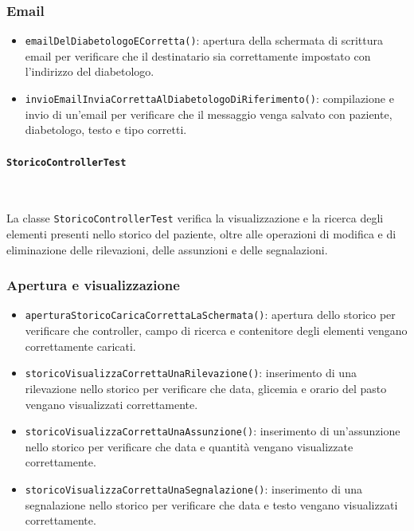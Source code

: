 \subsubsection*{Email}

\begin{itemize}
	
	\item \texttt{emailDelDiabetologoECorretta()}: apertura della schermata di scrittura email per verificare che il destinatario sia correttamente impostato con l'indirizzo del diabetologo.
	
	\item \texttt{invioEmailInviaCorrettaAlDiabetologoDiRiferimento()}: compilazione e invio di un'email per verificare che il messaggio venga salvato con paziente, diabetologo, testo e tipo corretti.
	
\end{itemize}

\paragraph{\texttt{StoricoControllerTest}}\mbox{}\

La classe \texttt{StoricoControllerTest} verifica la visualizzazione e la ricerca degli elementi presenti nello storico del paziente, oltre alle operazioni di modifica e di eliminazione delle rilevazioni, delle assunzioni e delle segnalazioni.

\subsubsection*{Apertura e visualizzazione}

\begin{itemize}
	
	\item \texttt{aperturaStoricoCaricaCorrettaLaSchermata()}: apertura dello storico per verificare che controller, campo di ricerca e contenitore degli elementi vengano correttamente caricati.
	
	\item \texttt{storicoVisualizzaCorrettaUnaRilevazione()}: inserimento di una rilevazione nello storico per verificare che data, glicemia e orario del pasto vengano visualizzati correttamente.
	
	\item \texttt{storicoVisualizzaCorrettaUnaAssunzione()}: inserimento di un'assunzione nello storico per verificare che data e quantità vengano visualizzate correttamente.
	
	\item \texttt{storicoVisualizzaCorrettaUnaSegnalazione()}: inserimento di una segnalazione nello storico per verificare che data e testo vengano visualizzati correttamente.
	
\end{itemize}

